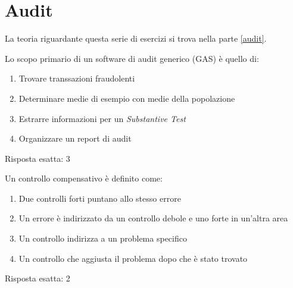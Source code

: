 \chapter{Audit}
\label{EsAudit}

La teoria riguardante questa serie di esercizi si trova nella
parte \ref{audit}.

\begin{Exercise} [
  title={Quiz},
  label={audit1}
  ]

  \Question Lo scopo primario di un software di audit generico (GAS) è quello 
di:
\begin{enumerate}
 \item Trovare transsazioni fraudolenti
 \item Determinare medie di esempio con medie della popolazione
 \item Estrarre informazioni per un \textit{Substantive Test}
 \item Organizzare un report di audit
\end{enumerate}

\end{Exercise}


\begin{Answer} [
  ref={audit1},
  number={1}
  ]

  \Question Risposta esatta: 3

\end{Answer}


\begin{Exercise} [
  title={Quiz},
  label={audit2}
  ]

  \Question Un controllo compensativo è definito come:
  \begin{enumerate}
   \item Due controlli forti puntano allo stesso errore
   \item Un errore è indirizzato da un controllo debole e uno forte in un'altra 
area
   \item Un controllo indirizza a un problema specifico
   \item Un controllo che aggiusta il problema dopo che è stato trovato
  \end{enumerate}

\end{Exercise}


\begin{Answer} [
  ref={audit2},
  number={2}
  ]

  \Question Risposta esatta: 2

\end{Answer}


